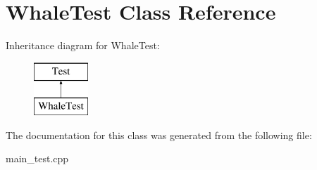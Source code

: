 \hypertarget{class_whale_test}{}\section{Whale\+Test Class Reference}
\label{class_whale_test}
Inheritance diagram for Whale\+Test\+:\begin{figure}[H]
\begin{center}
\leavevmode
\includegraphics[height=2.000000cm]{class_whale_test}
\end{center}
\end{figure}


The documentation for this class was generated from the following file\+:\begin{DoxyCompactItemize}
\item 
main\+\_\+test.\+cpp\end{DoxyCompactItemize}

